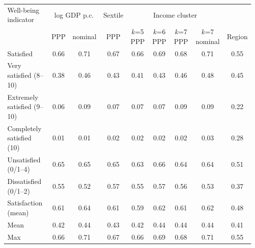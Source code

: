 \begin{tabular}{lcccccccc}
\toprule
Well-being indicator & \multicolumn{2}{c}{log GDP p.c.} & Sextile & \multicolumn{4}{c}{Income cluster} \\ & PPP & nominal & PPP & $k$=5 PPP & $k$=6 PPP & $k$=7 PPP & $k$=7 nominal & Region \\
\midrule
Satisfied & 0.66 & 0.71 & 0.67 & 0.66 & 0.69 & 0.68 & 0.71 & 0.55 \\
Very satisfied (8--10) & 0.38 & 0.46 & 0.43 & 0.41 & 0.43 & 0.46 & 0.48 & 0.45 \\
Extremely satisfied (9--10) & 0.06 & 0.09 & 0.07 & 0.07 & 0.07 & 0.09 & 0.09 & 0.22 \\
Completely satisfied (10) & 0.01 & 0.01 & 0.02 & 0.02 & 0.02 & 0.02 & 0.03 & 0.28 \\
Unsatisfied (0/1--4) & 0.65 & 0.65 & 0.65 & 0.63 & 0.66 & 0.64 & 0.64 & 0.51 \\
Dissatisfied (0/1--2) & 0.55 & 0.52 & 0.57 & 0.55 & 0.57 & 0.56 & 0.53 & 0.37 \\
Satisfaction (mean) & 0.61 & 0.64 & 0.61 & 0.59 & 0.62 & 0.61 & 0.62 & 0.48 \\
\midrule
Mean & 0.42 & 0.44 & 0.43 & 0.42 & 0.44 & 0.44 & 0.44 & 0.41 \\
Max & 0.66 & 0.71 & 0.67 & 0.66 & 0.69 & 0.68 & 0.71 & 0.55 \\
\bottomrule
\end{tabular}
